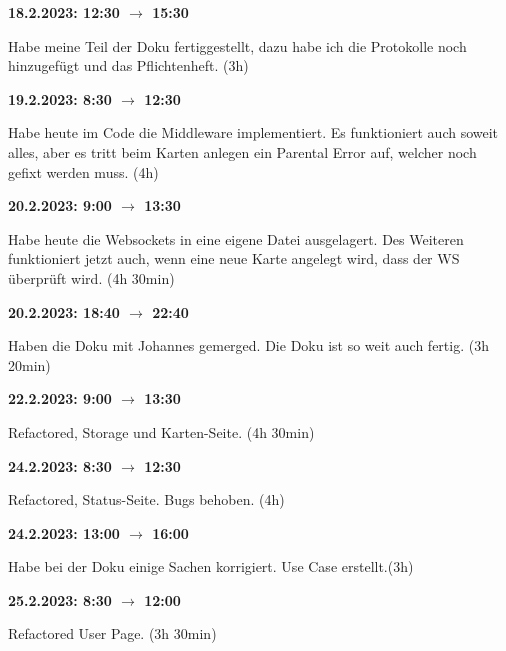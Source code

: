 \vspace{0.5cm}

\textbf{18.2.2023: 12:30 $\rightarrow$ 15:30} \

Habe meine Teil der Doku fertiggestellt, dazu habe ich die Protokolle noch hinzugefügt und das Pflichtenheft. (3h)

\vspace{0.5cm}

\textbf{19.2.2023: 8:30 $\rightarrow$ 12:30} \

Habe heute im Code die Middleware implementiert. Es funktioniert auch soweit alles, aber es tritt beim Karten anlegen ein Parental Error auf, welcher noch gefixt werden muss. (4h)

\vspace{0.5cm}

\textbf{20.2.2023: 9:00 $\rightarrow$ 13:30} \

Habe heute die Websockets in eine eigene Datei ausgelagert. Des Weiteren funktioniert jetzt auch, wenn eine neue Karte angelegt wird, dass der WS überprüft wird. (4h 30min)

\vspace{0.5cm}

\textbf{20.2.2023: 18:40 $\rightarrow$ 22:40} \

Haben die Doku mit Johannes gemerged. Die Doku ist so weit auch fertig. (3h 20min)

\vspace{0.5cm}

\textbf{22.2.2023: 9:00 $\rightarrow$ 13:30} \

Refactored, Storage und Karten-Seite. (4h 30min)

\vspace{0.5cm}

\textbf{24.2.2023: 8:30 $\rightarrow$ 12:30} \

Refactored, Status-Seite. Bugs behoben. (4h)

\vspace{0.5cm}

\textbf{24.2.2023: 13:00 $\rightarrow$ 16:00} \

Habe bei der Doku einige Sachen korrigiert. Use Case erstellt.(3h)

\vspace{0.5cm}

\textbf{25.2.2023: 8:30 $\rightarrow$ 12:00} \

Refactored User Page. (3h 30min)

\vspace{0.5cm}

